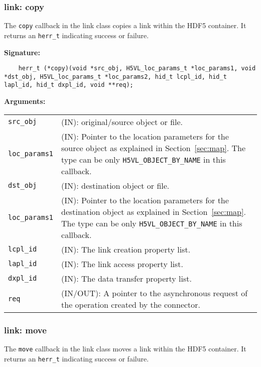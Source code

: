 \subsubsection{link: copy}
The \texttt{copy} callback in the link class copies a link within the HDF5 container. It returns an \texttt{herr\_t} indicating success or failure.\bigskip

\begin{mdframed}[style=bgbox]
\textbf{Signature:}
\begin{lstlisting}
    herr_t (*copy)(void *src_obj, H5VL_loc_params_t *loc_params1, void *dst_obj, H5VL_loc_params_t *loc_params2, hid_t lcpl_id, hid_t lapl_id, hid_t dxpl_id, void **req);
\end{lstlisting}

\textbf{Arguments:}\\
\begin{tabular}{l p{13.5cm}}
  \texttt{src\_obj} & (IN): original/source object or file. \\
  \texttt{loc\_params1} & (IN): Pointer to the location parameters for the source
  object as explained in Section~\ref{sec:map}. The type can be only \texttt{H5VL\_OBJECT\_BY\_NAME} in this callback. \\
  \texttt{dst\_obj} & (IN): destination object or file. \\
  \texttt{loc\_params1} & (IN): Pointer to the location parameters for the destination
  object as explained in Section~\ref{sec:map}. The type can be only \texttt{H5VL\_OBJECT\_BY\_NAME} in this callback. \\
  \texttt{lcpl\_id} & (IN): The link creation property list.\\
  \texttt{lapl\_id} & (IN): The link access property list.\\
  \texttt{dxpl\_id} & (IN): The data transfer property list.\\
  \texttt{req} & (IN/OUT): A pointer to the asynchronous request of the
  operation created by the connector.\\
\end{tabular}
\end{mdframed}

\subsubsection{link: move}
The \texttt{move} callback in the link class moves a link within the HDF5 container. It returns an \texttt{herr\_t} indicating success or failure.\bigskip

